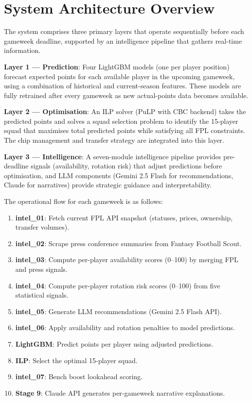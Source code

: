 
\section{System Architecture Overview}

The system comprises three primary layers that operate sequentially before each gameweek deadline, supported by an intelligence pipeline that gathers real-time information.

\textbf{Layer 1 — Prediction}: Four LightGBM models (one per player position) forecast expected points for each available player in the upcoming gameweek, using a combination of historical and current-season features. These models are fully retrained after every gameweek as new actual-points data becomes available.

\textbf{Layer 2 — Optimisation}: An ILP solver (PuLP with CBC backend) takes the predicted points and solves a squad selection problem to identify the 15-player squad that maximises total predicted points while satisfying all FPL constraints. The chip management and transfer strategy are integrated into this layer.

\textbf{Layer 3 — Intelligence}: A seven-module intelligence pipeline provides pre-deadline signals (availability, rotation risk) that adjust predictions before optimisation, and LLM components (Gemini 2.5 Flash for recommendations, Claude for narratives) provide strategic guidance and interpretability.

The operational flow for each gameweek is as follows:
\begin{enumerate}
  \item \textbf{intel\_01}: Fetch current FPL API snapshot (statuses, prices, ownership, transfer volumes).
  \item \textbf{intel\_02}: Scrape press conference summaries from Fantasy Football Scout.
  \item \textbf{intel\_03}: Compute per-player availability scores (0--100) by merging FPL and press signals.
  \item \textbf{intel\_04}: Compute per-player rotation risk scores (0--100) from five statistical signals.
  \item \textbf{intel\_05}: Generate LLM recommendations (Gemini 2.5 Flash API).
  \item \textbf{intel\_06}: Apply availability and rotation penalties to model predictions.
  \item \textbf{LightGBM}: Predict points per player using adjusted predictions.
  \item \textbf{ILP}: Select the optimal 15-player squad.
  \item \textbf{intel\_07}: Bench boost lookahead scoring.
  \item \textbf{Stage 9}: Claude API generates per-gameweek narrative explanations.
\end{enumerate}

